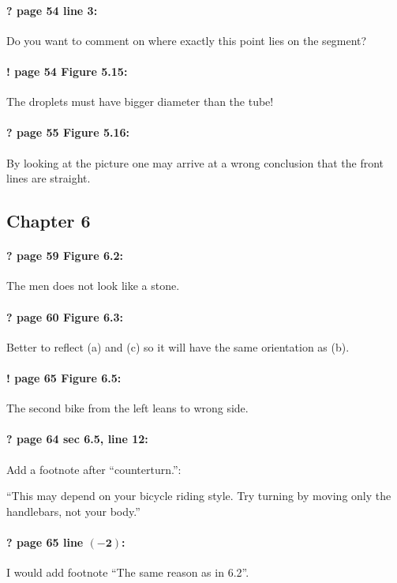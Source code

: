 \documentclass[twoside]{article}
\begin{document}
\paragraph{? page 54 line 3:} Do you want to comment on where exactly this point lies on the segment?

\paragraph{! page 54 Figure 5.15:} The droplets must have bigger diameter than the tube!

\paragraph{? page 55 Figure 5.16:} By looking at the picture one may arrive at a wrong conclusion that the front lines are straight.

\subsection*{Chapter 6}

\paragraph{? page 59 Figure 6.2:} The men does not look like a stone.

\paragraph{? page 60 Figure 6.3:} Better to reflect (a) and (c) so it will have the same orientation as (b).

\paragraph{! page 65 Figure 6.5:} The second bike from the left leans to wrong side.

\paragraph{? page 64 sec 6.5, line 12:} Add a footnote after ``counterturn.'':

``This may depend on your bicycle riding style. Try turning by moving only the handlebars, not your body.''

\paragraph{? page 65 line $\bm{(-2)}$:} I would add footnote ``The same reason as in 6.2''.
\end{document}
